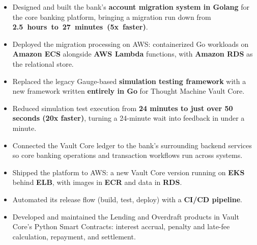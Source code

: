 \begin{itemize}
    \item Designed and built the bank's \textbf{account migration system in Golang} for the core banking platform, bringing a migration run down from \mbox{\textbf{2.5 hours to 27 minutes (5x faster)}}. %
    \item Deployed the migration processing on AWS: containerized Go workloads on \textbf{Amazon ECS} alongside \textbf{AWS Lambda} functions, with \textbf{Amazon RDS} as the relational store. %
\end{itemize}
\begin{itemize}
    \item Replaced the legacy Gauge-based \textbf{simulation testing framework} with a new framework written \textbf{entirely in Go} for Thought Machine Vault Core. %
    \item Reduced simulation test execution from \textbf{24 minutes to just over 50 seconds (20x faster)}, turning a 24-minute wait into feedback in under a minute. %
\end{itemize}
\begin{itemize}
    \item Connected the Vault Core ledger to the bank's surrounding backend services so core banking operations and transaction workflows run across systems. %
    \item Shipped the platform to AWS: a new Vault Core version running on \textbf{EKS} behind \textbf{ELB}, with images in \textbf{ECR} and data in \textbf{RDS}. %
    \item Automated its release flow (build, test, deploy) with a \textbf{CI/CD pipeline}. %
    \item Developed and maintained the Lending and Overdraft products in Vault Core's Python Smart Contracts: interest accrual, penalty and late-fee calculation, repayment, and settlement. %
\end{itemize}

